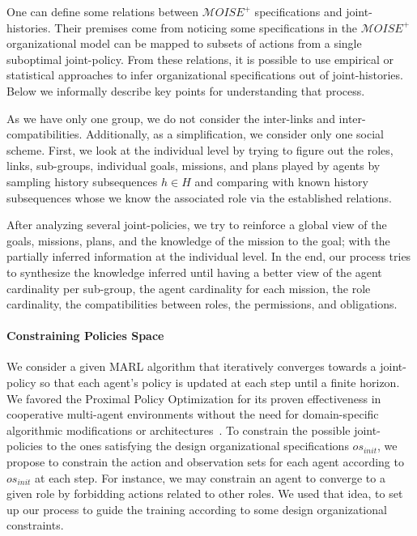 \documentclass[runningheads]{llncs}
\newcounter{relation}
\begin{document}
One can define some relations between $\mathcal{M}OISE^+$ specifications and joint-histories. Their premises come from noticing some specifications in the $\mathcal{M}OISE^+$ organizational model can be mapped to subsets of actions from a single suboptimal joint-policy.
From these relations, it is possible to use empirical or statistical approaches to infer organizational specifications out of joint-histories. Below we informally describe key points for understanding that process.

As we have only one group, we do not consider the inter-links and inter-compatibilities. Additionally, as a simplification, we consider only one social scheme.
First, we look at the individual level by trying to figure out the roles, links, sub-groups, individual goals, missions, and plans played by agents by sampling history subsequences $h \in H$ and comparing with known history subsequences whose we know the associated role via the established relations.

After analyzing several joint-policies, we try to reinforce a global view of the goals, missions, plans, and the knowledge of the mission to the goal; with the partially inferred information at the individual level.
In the end, our process tries to synthesize the knowledge inferred until having a better view of the agent cardinality per sub-group, the agent cardinality for each mission, the role cardinality, the compatibilities between roles, the permissions, and obligations.

\paragraph{\textbf{Constraining Policies Space}}

We consider a given MARL algorithm that iteratively converges towards a joint-policy so that each agent's policy is updated at each step until a finite horizon.
We favored the Proximal Policy Optimization for its proven effectiveness in cooperative multi-agent environments without the need for domain-specific algorithmic modifications or architectures~\cite{Yu2022}.
To constrain the possible joint-policies to the ones satisfying the design organizational specifications $os_{init}$, we propose to constrain the action and observation sets for each agent according to $os_{init}$  at each step. For instance, we may constrain an agent to converge to a given role by forbidding actions related to other roles. We used that idea, to set up our process to guide the training according to some design organizational constraints.
\end{document}
